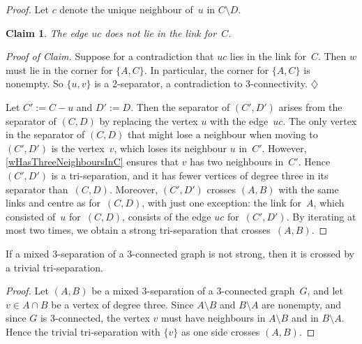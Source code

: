 \documentclass{aic}
\newenvironment{cproof}{\noindent\textit{Proof of Claim.}}{\phantom{!}\!\hfill$\diamondsuit$}
\theoremstyle{plain}
\newtheorem{sublem}{Claim}[thm]
\theoremstyle{definition}
\theoremstyle{plain}
\theoremstyle{plain}
\newcommand{\sm}{\setminus}
\begin{document}
\begin{proof}
Let $c$ denote the unique neighbour of~$u$ in $C\sm D$.

\begin{sublem}\label{uHasNeighbourInCorner}
The edge $uc$ does not lie in the link for~$C$.
\end{sublem}
\begin{cproof}
Suppose for a contradiction that $uc$ lies in the link for~$C$.
Then $w$ must lie in the corner for $\{A,C\}$.
In particular, the corner for $\{A,C\}$ is nonempty.
So $\{u,v\}$ is a 2-separator, a contradiction to 3-connectivity.
\end{cproof}\medskip

Let $C':=C-u$ and $D':=D$.
Then the separator of $(C',D')$ arises from the separator of $(C,D)$ by replacing the vertex $u$ with the edge~$uc$.
The only vertex in the separator of $(C,D)$ that might lose a neighbour when moving to $(C',D')$ is the vertex~$v$, which loses its neighbour $u$ in~$C'$.
However, \autoref{wHasThreeNeighboursInC} ensures that $v$ has two neighbours in~$C'$.
Hence $(C',D')$ is a tri-separation, and it has fewer vertices of degree three in its separator than~$(C,D)$.
Moreover, $(C',D')$ crosses $(A,B)$ with the same links and centre as for~$(C,D)$, with just one exception: the link for~$A$, which consisted of~$u$ for~$(C,D)$, consists of the edge $uc$ for~$(C',D')$.
By iterating at most two times, we obtain a strong tri-separation that crosses~$(A,B)$.
\end{proof}

\begin{lem}\label{notStrongImpliesCrossed}
If a mixed 3-separation of a 3-connected graph is not strong, then it is crossed by a trivial tri-separation.
\end{lem}
\begin{proof}
Let $(A,B)$ be a mixed 3-separation of a 3-connected graph~$G$, and let $v\in A\cap B$ be a vertex of degree three.
Since $A\sm B$ and $B\sm A$ are nonempty, and since $G$ is 3-connected, the vertex $v$ must have neighbours in $A\sm B$ and in $B\sm A$.
Hence the trivial tri-separation with $\{v\}$ as one side crosses $(A,B)$.
\end{proof}
\end{document}
